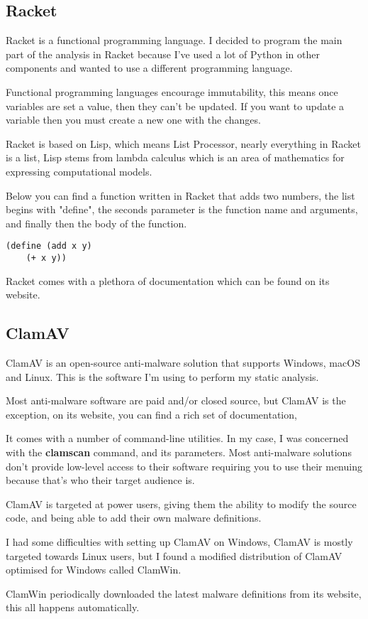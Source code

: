 \subsection{Racket}
Racket is a functional programming language. \cite{racket}
I decided to program the main part of the analysis in Racket
because I've used a lot of Python in other components and
wanted to use a different programming language.

Functional programming languages encourage immutability,
this means once variables are set a value, then they can't be updated.
If you want to update a variable then you must create a new one with
the changes.

Racket is based on Lisp, which means List Processor,
nearly everything in Racket is a list,
Lisp stems from lambda calculus which is an area
of mathematics for expressing computational models.

Below you can find a function written in Racket that adds two numbers,
the list begins with "define", the seconds parameter is the function name and arguments,
and finally then the body of the function.

\begin{lstlisting}
(define (add x y)
    (+ x y))
\end{lstlisting}

Racket comes with a plethora of documentation which can be found on its website.

\subsection{ClamAV}
ClamAV is an open-source anti-malware solution that
supports Windows, macOS and Linux. \cite{clamav}
This is the software I'm using to perform my static analysis.

Most anti-malware software are paid and/or closed source,
but ClamAV is the exception, on its website, you can find a rich set of documentation,

It comes with a number of command-line utilities.
In my case, I was concerned with the \textbf{clamscan} command, and its parameters.
Most anti-malware solutions don't provide low-level access to their software
requiring you to use their menuing because that's who their target audience is.

ClamAV is targeted at power users,
giving them the ability to modify the source code,
and being able to add their own malware definitions.

I had some difficulties with setting up ClamAV on Windows,
ClamAV is mostly targeted towards Linux users,
but I found a modified distribution of ClamAV optimised for Windows
called ClamWin.

ClamWin periodically downloaded the latest malware definitions from its website,
this all happens automatically.
